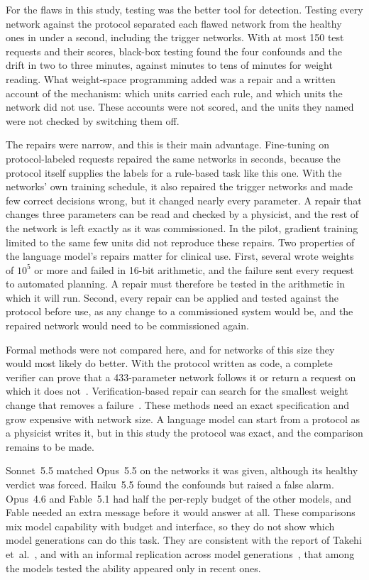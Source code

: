 \documentclass[aps,prx,reprint,superscriptaddress,nofootinbib]{revtex4-2}
\begin{document}
For the flaws in this study, testing was the better tool for detection. Testing every network
against the protocol separated each flawed network from the healthy ones in under a second,
including the trigger networks. With at most 150 test requests and their scores, black-box testing
found the four confounds and the drift in two to three minutes, against minutes to tens of minutes
for weight reading. What weight-space programming added was a repair and a written account of the
mechanism: which units carried each rule, and which units the network did not use. These accounts
were not scored, and the units they named were not checked by switching them off.

The repairs were narrow, and this is their main advantage. Fine-tuning on protocol-labeled requests
repaired the same networks in seconds, because the protocol itself supplies the labels for a
rule-based task like this one. With the networks' own training schedule, it also repaired the
trigger networks and made few correct decisions wrong, but it changed nearly every parameter. A
repair that changes three parameters can be read and checked by a physicist, and the rest of the
network is left exactly as it was commissioned. In the pilot, gradient training limited to the same
few units did not reproduce these repairs. Two properties of the language model's repairs matter for
clinical use. First, several wrote weights of $10^{5}$ or more and failed in 16-bit arithmetic, and
the failure sent every request to automated planning. A repair must therefore be tested in the
arithmetic in which it will run. Second, every repair can be applied and tested against the protocol
before use, as any change to a commissioned system would be, and the repaired network would need to
be commissioned again.

Formal methods were not compared here, and for networks of this size they would most likely do
better. With the protocol written as code, a complete verifier can prove that a 433-parameter
network follows it or return a request on which it does not~\cite{katz2017,tjeng2019}.
Verification-based repair can search for the smallest weight change that removes a
failure~\cite{goldberger2020,sotoudeh2021}. These methods need an exact specification and grow
expensive with network size. A language model can start from a protocol as a physicist writes it,
but in this study the protocol was exact, and the comparison remains to be made.

Sonnet~5.5 matched Opus~5.5 on the networks it was given, although its healthy verdict was forced.
Haiku~5.5 found the confounds but raised a false alarm. Opus~4.6 and Fable~5.1 had half the
per-reply budget of the other models, and Fable needed an extra message before it would answer at
all. These comparisons mix model capability with budget and interface, so they do not show which
model generations can do this task. They are consistent with the report of Takehi
et~al.~\cite{takehi2026}, and with an informal replication across model
generations~\cite{krentsel2026}, that among the models tested the ability appeared only in recent
ones.
\end{document}
